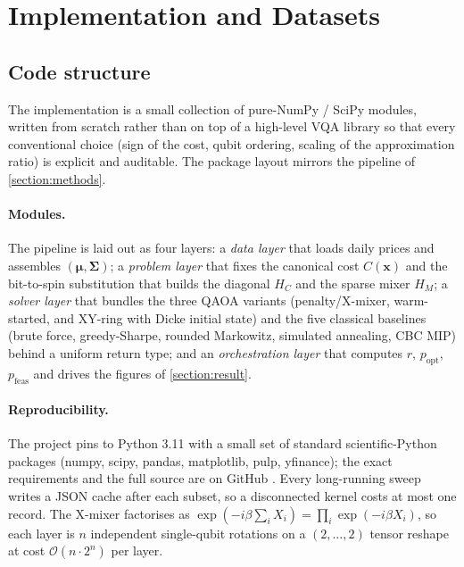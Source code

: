 \section{Implementation and Datasets}\label{section:impl}

\subsection{Code structure}\label{subsec:codestructure}

The implementation is a small collection of pure-NumPy / SciPy modules, written from scratch rather than on top of a high-level VQA library so that every conventional choice (sign of the cost, qubit ordering, scaling of the approximation ratio) is explicit and auditable. The package layout mirrors the pipeline of \cref{section:methods}.

\paragraph{Modules.} The pipeline is laid out as four layers: a \emph{data layer} that loads daily prices and assembles $(\boldsymbol{\mu},\boldsymbol{\Sigma})$; a \emph{problem layer} that fixes the canonical cost $C(\boldsymbol{x})$ and the bit-to-spin substitution that builds the diagonal $H_C$ and the sparse mixer $H_M$; a \emph{solver layer} that bundles the three QAOA variants (penalty/X-mixer, warm-started, and XY-ring with Dicke initial state) and the five classical baselines (brute force, greedy-Sharpe, rounded Markowitz, simulated annealing, CBC MIP) behind a uniform return type; and an \emph{orchestration layer} that computes $r$, $p_{\text{opt}}$, $p_{\text{feas}}$ and drives the figures of \cref{section:result}.

\paragraph{Reproducibility.} The project pins to Python 3.11 with a small set of standard scientific-Python packages (numpy, scipy, pandas, matplotlib, pulp, yfinance); the exact requirements and the full source are on GitHub \parencite{furnes2026fys5419}. Every long-running sweep writes a JSON cache after each subset, so a disconnected kernel costs at most one record. The X-mixer factorises as $\exp(-i\beta\sum_i X_i) = \prod_i \exp(-i\beta X_i)$, so each layer is $n$ independent single-qubit rotations on a $(2,\dots,2)$ tensor reshape at cost $\mathcal{O}(n\cdot 2^n)$ per layer.


